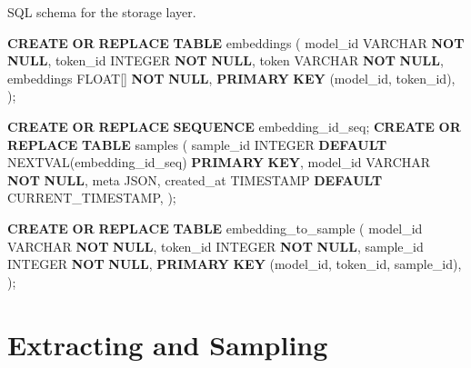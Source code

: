 \documentclass[
  a4paper, twoside, 10pt, titlepage]{book}
\newenvironment{Shaded}{}{}
\newcommand{\DataTypeTok}[1]{\textcolor[rgb]{0.56,0.13,0.00}{#1}}
\newcommand{\FunctionTok}[1]{\textcolor[rgb]{0.02,0.16,0.49}{#1}}
\newcommand{\KeywordTok}[1]{\textcolor[rgb]{0.00,0.44,0.13}{\textbf{#1}}}
\newcommand{\NormalTok}[1]{#1}
\newcommand{\StringTok}[1]{\textcolor[rgb]{0.25,0.44,0.63}{#1}}
\begin{document}
\begin{codelisting}

\caption{SQL schema for the storage layer.}\label{lst:sqlschema}

\begin{Shaded}
\begin{Highlighting}[]
\KeywordTok{CREATE} \KeywordTok{OR} \KeywordTok{REPLACE} \KeywordTok{TABLE}\NormalTok{ embeddings (}
\NormalTok{    model\_id }\DataTypeTok{VARCHAR} \KeywordTok{NOT} \KeywordTok{NULL}\NormalTok{,}
\NormalTok{    token\_id }\DataTypeTok{INTEGER} \KeywordTok{NOT} \KeywordTok{NULL}\NormalTok{,}
\NormalTok{    token }\DataTypeTok{VARCHAR} \KeywordTok{NOT} \KeywordTok{NULL}\NormalTok{,}
\NormalTok{    embeddings }\DataTypeTok{FLOAT}\NormalTok{[] }\KeywordTok{NOT} \KeywordTok{NULL}\NormalTok{,}
    \KeywordTok{PRIMARY} \KeywordTok{KEY}\NormalTok{ (model\_id, token\_id),}
\NormalTok{);}

\KeywordTok{CREATE} \KeywordTok{OR} \KeywordTok{REPLACE} \KeywordTok{SEQUENCE}\NormalTok{ embedding\_id\_seq;}
\KeywordTok{CREATE} \KeywordTok{OR} \KeywordTok{REPLACE} \KeywordTok{TABLE}\NormalTok{ samples (}
\NormalTok{    sample\_id }\DataTypeTok{INTEGER} \KeywordTok{DEFAULT}\NormalTok{ NEXTVAL(}\StringTok{\textquotesingle{}embedding\_id\_seq\textquotesingle{}}\NormalTok{) }\KeywordTok{PRIMARY} \KeywordTok{KEY}\NormalTok{,}
\NormalTok{    model\_id }\DataTypeTok{VARCHAR} \KeywordTok{NOT} \KeywordTok{NULL}\NormalTok{,}
\NormalTok{    meta JSON,}
\NormalTok{    created\_at }\DataTypeTok{TIMESTAMP} \KeywordTok{DEFAULT} \FunctionTok{CURRENT\_TIMESTAMP}\NormalTok{,}
\NormalTok{);}

\KeywordTok{CREATE} \KeywordTok{OR} \KeywordTok{REPLACE} \KeywordTok{TABLE}\NormalTok{ embedding\_to\_sample (}
\NormalTok{    model\_id }\DataTypeTok{VARCHAR} \KeywordTok{NOT} \KeywordTok{NULL}\NormalTok{,}
\NormalTok{    token\_id }\DataTypeTok{INTEGER} \KeywordTok{NOT} \KeywordTok{NULL}\NormalTok{,}
\NormalTok{    sample\_id }\DataTypeTok{INTEGER} \KeywordTok{NOT} \KeywordTok{NULL}\NormalTok{,}
    \KeywordTok{PRIMARY} \KeywordTok{KEY}\NormalTok{ (model\_id, token\_id, sample\_id),}
\NormalTok{);}
\end{Highlighting}
\end{Shaded}

\end{codelisting}

\clearpage

\section{Extracting and Sampling}\label{extracting-and-sampling}
\end{document}

